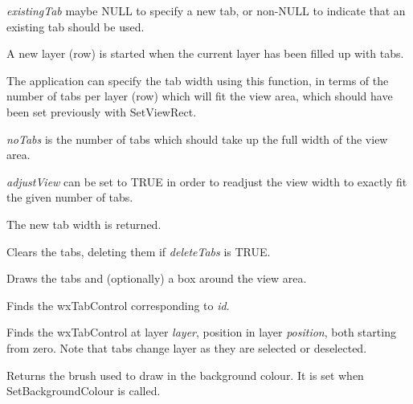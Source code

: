 {\it existingTab} maybe NULL to specify a new tab, or non-NULL to indicate that an existing tab should be used.

A new layer (row) is started when the current layer has been filled up with tabs.

\label{wxtabviewcalculatetabwidth}


The application can specify the tab width using this function, in terms
of the number of tabs per layer (row) which will fit the view area, which
should have been set previously with SetViewRect.

{\it noTabs} is the number of tabs which should take up the full width
of the view area.

{\it adjustView} can be set to TRUE in order to readjust the view width
to exactly fit the given number of tabs. 

The new tab width is returned.



Clears the tabs, deleting them if {\it deleteTabs} is TRUE.



Draws the tabs and (optionally) a box around the view area.



Finds the wxTabControl corresponding to {\it id}.



Finds the wxTabControl at layer {\it layer}, position in layer {\it position}, both starting from
zero. Note that tabs change layer as they are selected or deselected.



Returns the brush used to draw in the background colour. It is set when
SetBackgroundColour is called. 


